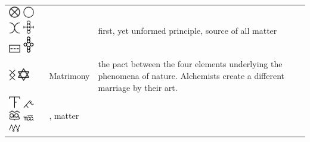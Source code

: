 \documentclass[british,final,landscape]{scrartcl}
\begin{document}
\begin{refsection}
\begin{supertabular}{p{0.3\textwidth}p{0.34\textwidth}p{0.34\textwidth}}
  \includegraphics[width=5mm]{Concepts/MateriaPrima} \includegraphics[width=5mm]{Concepts/MateriaPrima2} \includegraphics[width=5mm]{Concepts/MateriaPrima3} \includegraphics[width=5mm]{Concepts/MateriaPrima4} \includegraphics[width=5mm]{Concepts/MateriaPrima5} \includegraphics[width=5mm]{Concepts/MateriaPrima6} &  & first, yet unformed principle, source of all matter \\
  \includegraphics[height=5mm]{Concepts/Matrimony} \includegraphics[width=5mm]{Concepts/Matrimony2} & Matrimony & the pact between the four elements underlying the phenomena of nature. Alchemists create a different marriage by their art. \\
  \includegraphics[width=5mm]{Concepts/Materia} \includegraphics[width=5mm]{Concepts/Materia2} \includegraphics[width=5mm]{Concepts/Materia3} \includegraphics[width=5mm]{Concepts/Materia4} \includegraphics[width=5mm]{Concepts/Materia5} & , matter & \\

\end{supertabular}
\end{refsection}
\end{document}
